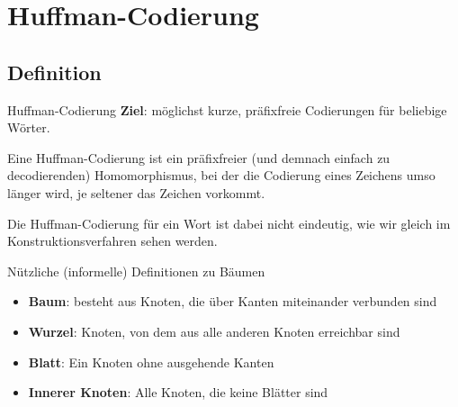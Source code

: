 \section{Huffman-Codierung}
\subsection{Definition}

\begin{frame}{Huffman-Codierung}
	\textbf{Ziel}: möglichst kurze, präfixfreie Codierungen für beliebige Wörter.
	\pause
	\begin{exampleblock}{}
		Eine Huffman-Codierung ist ein präfixfreier (und demnach einfach zu decodierenden) Homomorphismus, bei der die Codierung eines Zeichens umso länger wird, je seltener das Zeichen vorkommt.
	
		Die Huffman-Codierung für ein Wort ist dabei nicht eindeutig, wie wir gleich im Konstruktionsverfahren sehen werden.
	\end{exampleblock}
\end{frame}
\begin{frame}
	\begin{block}{Nützliche (informelle) Definitionen zu Bäumen}
		\begin{itemize}
			\item \textbf{Baum}: besteht aus Knoten, die über Kanten miteinander verbunden sind
			\item \textbf{Wurzel}: Knoten, von dem aus alle anderen Knoten erreichbar sind
			\item \textbf{Blatt}: Ein Knoten ohne ausgehende Kanten
			\item \textbf{Innerer Knoten}: Alle Knoten, die keine Blätter sind
		\end{itemize}
	\end{block}
\end{frame}

